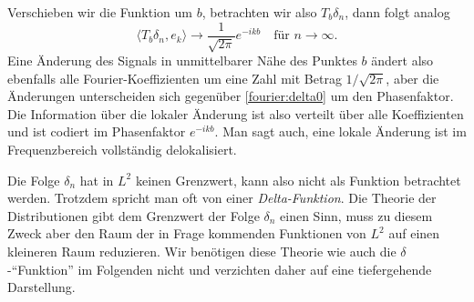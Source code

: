 Verschieben wir die Funktion um $b$, betrachten wir also
$T_b\delta_n$, dann folgt analog
\begin{equation}
\langle T_b\delta_n,e_k\rangle
\to
\frac{1}{\sqrt{2\pi}}e^{-ikb}
\quad
\text{für $n\to\infty$}.
\label{fourier:deltab}
\end{equation}
Eine Änderung des Signals in unmittelbarer Nähe des Punktes $b$ ändert also
ebenfalls alle Fourier-Koeffizienten um eine Zahl mit Betrag
$1/\sqrt{2\pi}$, aber die Änderungen unterscheiden sich gegenüber
\eqref{fourier:delta0} um den Phasenfaktor.
Die Information über die lokaler Änderung ist also verteilt über alle
Koeffizienten und ist codiert im Phasenfaktor $e^{-ikb}$.
Man sagt auch, eine lokale Änderung ist im Frequenzbereich vollständig
delokalisiert.
%

Die Folge $\delta_n$ hat in $L^2$ keinen Grenzwert, kann also nicht als
Funktion betrachtet werden.
Trotzdem spricht man oft von einer {\em Delta-Funktion}.
%
%
Die Theorie der Distributionen gibt dem Grenzwert der Folge $\delta_n$ 
einen Sinn, muss zu diesem Zweck aber den Raum der in Frage kommenden
Funktionen von $L^2$ auf einen kleineren Raum reduzieren.
Wir benötigen diese Theorie wie auch die $\delta$-``Funktion'' im
Folgenden nicht und verzichten daher auf eine tiefergehende Darstellung.

